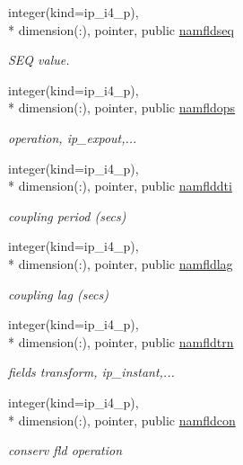 \begin{DoxyCompactItemize}
integer(kind=ip\+\_\+i4\+\_\+p), \\*
dimension(\+:), pointer, public \hyperlink{classmod__oasis__namcouple_a54ccfe0380fc1c89d085f37a044a297e}{namfldseq}
\begin{DoxyCompactList}\small\item\em S\+E\+Q value. \end{DoxyCompactList}\item 
integer(kind=ip\+\_\+i4\+\_\+p), \\*
dimension(\+:), pointer, public \hyperlink{classmod__oasis__namcouple_a4841e350d91926f5f8403e73442c76ad}{namfldops}
\begin{DoxyCompactList}\small\item\em operation, ip\+\_\+expout,... \end{DoxyCompactList}\item 
integer(kind=ip\+\_\+i4\+\_\+p), \\*
dimension(\+:), pointer, public \hyperlink{classmod__oasis__namcouple_a9080617143dacb027f74c4c5158b5e58}{namflddti}
\begin{DoxyCompactList}\small\item\em coupling period (secs) \end{DoxyCompactList}\item 
integer(kind=ip\+\_\+i4\+\_\+p), \\*
dimension(\+:), pointer, public \hyperlink{classmod__oasis__namcouple_a6a4406ca14f91ef6514a18eb154e648f}{namfldlag}
\begin{DoxyCompactList}\small\item\em coupling lag (secs) \end{DoxyCompactList}\item 
integer(kind=ip\+\_\+i4\+\_\+p), \\*
dimension(\+:), pointer, public \hyperlink{classmod__oasis__namcouple_a5f81bc00e6dc045770edd4093f68278c}{namfldtrn}
\begin{DoxyCompactList}\small\item\em fields transform, ip\+\_\+instant,... \end{DoxyCompactList}\item 
integer(kind=ip\+\_\+i4\+\_\+p), \\*
dimension(\+:), pointer, public \hyperlink{classmod__oasis__namcouple_a96aa6a31ef021468f807819a84b327c3}{namfldcon}
\begin{DoxyCompactList}\small\item\em conserv fld operation \end{DoxyCompactList}\item 

\end{DoxyCompactItemize}
